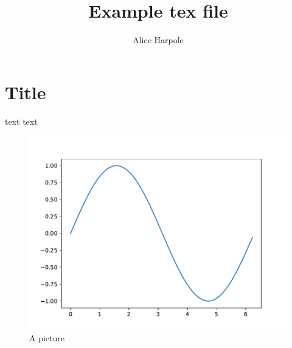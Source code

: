 \documentclass[11pt, twoside, a4paper, final]{article}
\author{Alice Harpole}
\title{Example tex file}
\begin{document}
\maketitle

\section{Title}

text text \citep{Trefethen2000}

\begin{figure}
\includegraphics{figures/fig.pdf}
\caption{A picture}
\end{figure}




\end{document}
